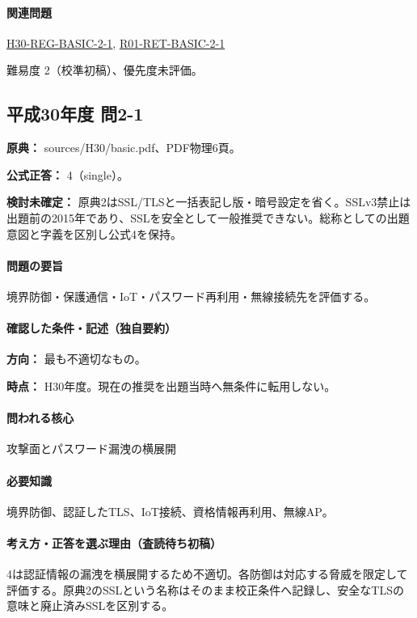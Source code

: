 \paragraph{関連問題} \hyperref[q:h30-reg-basic-2-1]{H30-REG-BASIC-2-1}, \hyperref[q:r01-ret-basic-2-1]{R01-RET-BASIC-2-1}

\par 難易度 2（校準初稿）、優先度未評価。

\subsection{平成30年度 問2-1}
\label{q:h30-reg-basic-2-1}

\noindent\textbf{原典：} sources/H30/basic.pdf、PDF物理6頁。

\textbf{公式正答：} 4（single）。

\par\textbf{検討未確定：} 原典2はSSL/TLSと一括表記し版・暗号設定を省く。SSLv3禁止は出題前の2015年であり、SSLを安全として一般推奨できない。総称としての出題意図と字義を区別し公式4を保持。

\paragraph{問題の要旨} 境界防御・保護通信・IoT・パスワード再利用・無線接続先を評価する。

\paragraph{確認した条件・記述（独自要約）}\mbox{}\par

\noindent\textbf{方向：} 最も不適切なもの。\par

\noindent\textbf{時点：} H30年度。現在の推奨を出題当時へ無条件に転用しない。\par

\paragraph{問われる核心} 攻撃面とパスワード漏洩の横展開

\paragraph{必要知識} 境界防御、認証したTLS、IoT接続、資格情報再利用、無線AP。

\paragraph{考え方・正答を選ぶ理由（査読待ち初稿）} 4は認証情報の漏洩を横展開するため不適切。各防御は対応する脅威を限定して評価する。原典2のSSLという名称はそのまま校正条件へ記録し、安全なTLSの意味と廃止済みSSLを区別する。

